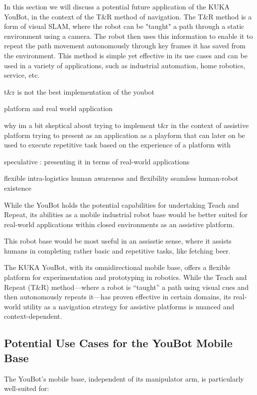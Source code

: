 \documentclass[a4paper, 12pt]{article}
\begin{document}
    In this section we will discuss a potential future application of the KUKA YouBot, in the context of the T\&R method of navigation. The T\&R method is a form of visual SLAM, where the robot can be "taught" a path through a static environment using a camera. The robot then uses this information to enable it to repeat the path movement autonomously through key frames it has saved from the environment. This method is simple yet effective in its use cases and can be used in a variety of applications, such as industrial automation, home robotics, service, etc.

    t\&r is not the best implementation of the youbot
    
    platform and real world application

    why im a bit skeptical about 
    trying to implement t\&r in the context of assistive platform 
    trying to present as an application as a playform that can later on be used to execute repetitive task based on the experience of a platform with 

    speculative : presenting it in terms of real-world applications

    flexible intra-logistics
    human awareness and flexibility 
    seamless human-robot existence

    While the YouBot holds the potential capabilities for undertaking Teach and Repeat, its abilities as a mobile industrial robot base would be better suited for real-world applications within closed environments as an assistive platform. 

    This robot base would be most useful in an assisstie  sense, where it assists humans in completing rather basic and repetitive tasks, like fetching beer. 

    The KUKA YouBot, with its omnidirectional mobile base, offers a flexible platform for experimentation and prototyping in robotics. While the Teach and Repeat (T\&R) method---where a robot is ``taught'' a path using visual cues and then autonomously repeats it---has proven effective in certain domains, its real-world utility as a navigation strategy for assistive platforms is nuanced and context-dependent.

    \subsection{Potential Use Cases for the YouBot Mobile Base}

    The YouBot's mobile base, independent of its manipulator arm, is particularly well-suited for:
\end{document}
